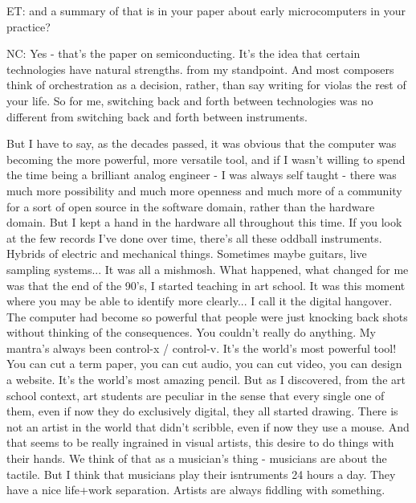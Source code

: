 ET: and a summary of that is in your paper about early microcomputers in your practice? 

NC: Yes - that's the paper on semiconducting. It's the idea that certain technologies have natural strengths. from my standpoint. And most composers think of orchestration as a decision, rather, than say writing for violas the rest of your life. So for me, switching back and forth between technologies was no different from switching back and forth between instruments. 

But I have to say, as the decades passed, it was obvious that the computer was becoming the more powerful, more versatile tool, and if I wasn't willing to spend the time being a brilliant analog engineer - I was always self taught - there was much more possibility and much more openness and much more of a community for a sort of open source in the software domain, rather than the hardware domain. But I kept a hand in the hardware all throughout this time. If you look at the few records I've done over time, there's all these oddball instruments. Hybrids of electric and mechanical things. Sometimes maybe guitars, live sampling systems... It was all a mishmosh. What happened, what changed for me was that the end of the 90's, I started teaching in art school. It was this moment where you may be able to identify more clearly... I call it the digital hangover. The computer had become so powerful that people were just knocking back shots without thinking of the consequences. You couldn't really do anything. My mantra's always been control-x / control-v. It's the world's most powerful tool! You can cut a term paper, you can cut audio, you can cut video, you can design a website. It's the world's most amazing pencil. But as I discovered, from the art school context, art students are peculiar in the sense that every single one of them, even if now they do exclusively digital, they all started drawing. There is not an artist in the world that didn't scribble, even if now they use a mouse. And that seems to be really ingrained in visual artists, this desire to do things with their hands. We think of that as a musician's thing - musicians are about the tactile. But I think that musicians play their isntruments 24 hours a day. They have a nice life+work separation. Artists are always fiddling with something. 

